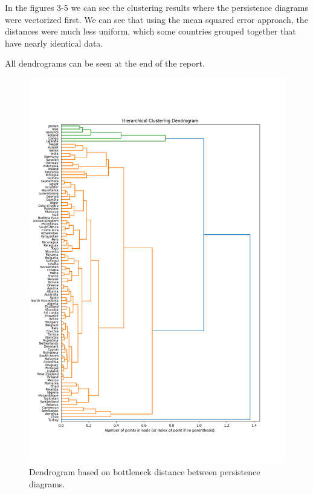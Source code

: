 \documentclass[12pt]{article}
\begin{document}
In the figures 3-5 we can see the clustering results where the persistence diagrams were vectorized first. We can see that using the mean squared error approach, the distances were much less uniform, which some countries grouped together that have nearly identical data.

All dendrograms can be seen at the end of the report.


\begin{figure}[t]
	\centering
	\includegraphics[width=15cm]{bottleneck.png}
	\caption{Dendrogram based on bottleneck distance between persistence diagrams.}
\end{figure}
\end{document}
